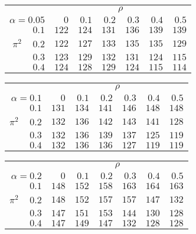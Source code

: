 \begin{tabular}{r|rrrrrr}
\hline\hline
 &\multicolumn{6}{c}{$\rho$} \\ 
 $\alpha = 0.05$ & $0$ & $0.1$ & $0.2$ & $0.3$ & $0.4$ & $0.5$ \\ 
 \hline$0.1$ & $122$ & $124$ & $131$ & $136$ & $139$ & $139$\\ 
$\pi^2\;\;\;$ $0.2$ & $122$ & $127$ & $133$ & $135$ & $135$ & $129$\\ 
$0.3$ & $123$ & $129$ & $132$ & $131$ & $124$ & $115$\\ 
$0.4$ & $124$ & $128$ & $129$ & $124$ & $115$ & $114$\\ 
 \hline 
 \end{tabular}
 
 \vspace{2em} 
 
\begin{tabular}{r|rrrrrr}
\hline\hline
 &\multicolumn{6}{c}{$\rho$} \\ 
 $\alpha = 0.1$ & $0$ & $0.1$ & $0.2$ & $0.3$ & $0.4$ & $0.5$ \\ 
 \hline$0.1$ & $131$ & $134$ & $141$ & $146$ & $148$ & $148$\\ 
$\pi^2\;\;\;$ $0.2$ & $132$ & $136$ & $142$ & $143$ & $141$ & $128$\\ 
$0.3$ & $132$ & $136$ & $139$ & $137$ & $125$ & $119$\\ 
$0.4$ & $132$ & $136$ & $136$ & $127$ & $119$ & $119$\\ 
 \hline 
 \end{tabular}
 
 \vspace{2em} 
 
\begin{tabular}{r|rrrrrr}
\hline\hline
 &\multicolumn{6}{c}{$\rho$} \\ 
 $\alpha = 0.2$ & $0$ & $0.1$ & $0.2$ & $0.3$ & $0.4$ & $0.5$ \\ 
 \hline$0.1$ & $148$ & $152$ & $158$ & $163$ & $164$ & $163$\\ 
$\pi^2\;\;\;$ $0.2$ & $148$ & $152$ & $157$ & $157$ & $147$ & $132$\\ 
$0.3$ & $147$ & $151$ & $153$ & $144$ & $130$ & $128$\\ 
$0.4$ & $147$ & $149$ & $147$ & $132$ & $128$ & $128$\\ 
 \hline 
 \end{tabular}